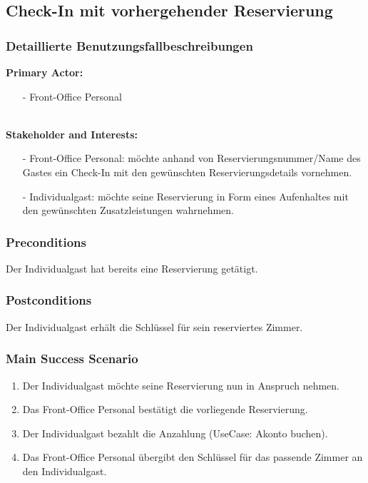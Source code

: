 \documentclass[./detailed_overview_usecases.tex]{subfiles}
\begin{document}
    \subsection{Check-In mit vorhergehender Reservierung}
    \subsubsection{Detaillierte Benutzungsfallbeschreibungen}
    \textbf{Primary Actor: }
    \begin{itemize}
        \item[-] Front-Office Personal
    \end{itemize}
    \\
    \textbf{Stakeholder and Interests:}
    \begin{itemize}
        \item[-] Front-Office Personal: möchte anhand von Reservierungsnummer/Name des Gastes ein Check-In mit den gewünschten Reservierungsdetails vornehmen.
        \item[-] Individualgast: möchte seine Reservierung in Form eines Aufenhaltes mit den gewünschten Zusatzleistungen wahrnehmen.
    \end{itemize}

    \subsubsection*{Preconditions}
    Der Individualgast hat bereits eine Reservierung getätigt.
    \subsubsection*{Postconditions}
    Der Individualgast erhält die Schlüssel für sein reserviertes Zimmer.

    \subsubsection*{Main Success Scenario}
    \begin{enumerate}
        \item Der Individualgast möchte seine Reservierung nun in Anspruch nehmen.
        \item Das Front-Office Personal bestätigt die vorliegende Reservierung.
        \item Der Individualgast bezahlt die Anzahlung (UseCase: Akonto buchen).
        \item Das Front-Office Personal übergibt den Schlüssel für das passende Zimmer an den Individualgast.
    \end{enumerate}
\end{document}
